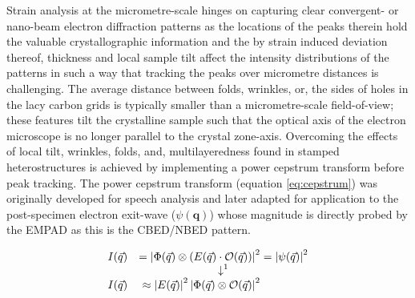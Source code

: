 Strain analysis at the micrometre-scale hinges on capturing clear convergent- or nano-beam electron diffraction patterns as the locations of the peaks therein hold the valuable crystallographic information and the by strain induced deviation thereof, thickness and local sample tilt affect the intensity distributions of the patterns in such a way that tracking the peaks over micrometre distances is challenging. The average distance between folds, wrinkles, or, the sides of holes in the lacy carbon grids is typically smaller than a micrometre-scale field-of-view; these features tilt the crystalline sample such that the optical axis of the electron microscope is no longer parallel to the crystal zone-axis. Overcoming the effects of local tilt, wrinkles, folds, and, multilayeredness found in stamped heterostructures is achieved by implementing a power cepstrum transform before peak tracking.
The power cepstrum transform (equation \ref{eq:cepstrum}) was originally developed for speech analysis \cite{1570854175999207936, oppenheimDspHistoryFrequency2004,nollCepstrumPitchDetermination1967} and later adapted for application to the post-specimen electron exit-wave ($\psi(\mathbf{q})$) whose magnitude is directly probed by the EMPAD \cite{padgettExitwavePowercepstrumTransform2020} as this is the CBED/NBED pattern.

\begin{alignat}{2}
	I(\vec{q}) &  & = \left| \Phi(\vec{q}) \otimes \left( E(\vec{q}) \cdot \mathcal{O}(\vec{q}) \right) \right|^2 & = \left| \psi(\vec{q}) \right|^2
	\label{eq:cbed_comp}                                                                                                                             \\
	\ArrowBetweenLines*[\downarrow^1\hspace{1cm}]%
	I(\vec{q}) &  & \approx \left|E(\vec{q}) \right|^2 \left|\Phi(\vec{q}) \otimes \mathcal{O}(\vec{q}) \right|^2 &
	\label{eq:cbed_approx}
\end{alignat}

